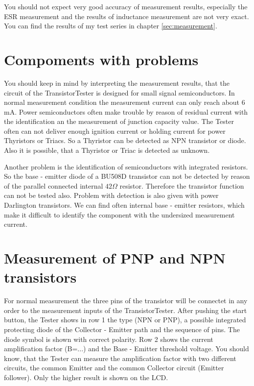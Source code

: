 You should not expect very good accuracy of measurement results, especially the ESR measurement and the results of inductance measurement are not very exact.
You can find the results of my test series in chapter \ref{sec:measurement}.

\section{Compoments with problems}
You should keep in mind by interpreting the measurement results, that the circuit of the TransistorTester is
designed for small signal semiconductors. In normal measurement condition the measurement current can only reach about 6 mA.
Power semiconductors often make trouble by reason of residual current with the identification an the measurement of junction capacity value.
The Tester often can not deliver enough ignition current or holding current for power Thyristors or Triacs.
So a Thyristor can be detected as NPN transistor or diode. Also it is possible, that a Thyristor or Triac is detected as unknown.

Another problem is the identification of semiconductors with integrated resistors.
So the base - emitter diode of a BU508D transistor can not be detected by reason of the parallel connected
internal \(42 \Omega\) resistor.
Therefore the transistor function can not be tested also.
Problem with detection is also given with power Darlington transistors. We can find often internal
base - emitter resistors, which make it difficult to identify the component with the undersized measurement current.

\section{Measurement of PNP and NPN transistors}
For normal measurement the three pins of the transistor will be connectet in any order to the measurement
inputs of the TransistorTester.
After pushing the start button, the Tester shows in row 1 the type (NPN or PNP), 
a possible integrated protecting diode of the Collector - Emitter path and the
sequence of pins. The diode symbol is shown with correct polarity.
Row 2 shows the current amplification factor (B=...) and the Base - Emitter threshold voltage.
You should know, that the Tester can measure the amplification factor with two different circuits,
the common Emitter and the common Collector circuit (Emitter follower).
Only the higher result is shown on the LCD.


